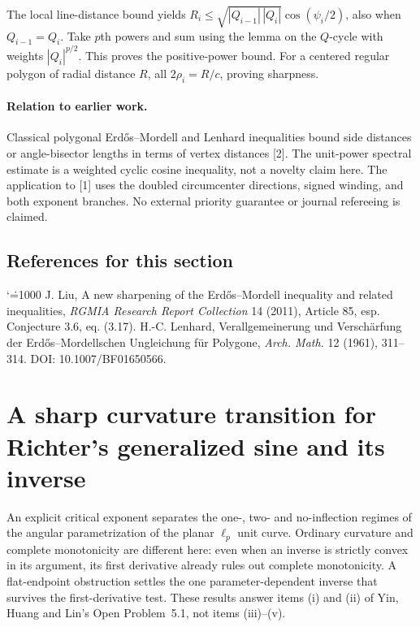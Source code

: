 \documentclass[11pt,a4paper]{article}
\makeatletter
\numberwithin{equation}{section}
\theoremstyle{definition}
\theoremstyle{remark}
\newenvironment{sectionabstract}{\par\smallskip\begingroup\small\noindent}{\par\endgroup\medskip}
\renewenvironment{thebibliography}[1]
 {\subsection*{References for this section}\small
  \list{\@biblabel{\@arabic\c@enumiv}}
       {\settowidth\labelwidth{\@biblabel{#1}}\leftmargin\labelwidth
        \advance\leftmargin\labelsep\@openbib@code
        \usecounter{enumiv}\let\p@enumiv\@empty
        \renewcommand\theenumiv{\@arabic\c@enumiv}}
  \sloppy\clubpenalty4000\widowpenalty4000\sfcode`\.=1000\relax}
 {\def\@noitemerr{\@latex@warning{Empty bibliography}}\endlist}
\makeatother
\begin{document}
The local line-distance bound yields $R_i\le\sqrt{|Q_{i-1}|\,|Q_i|}\cos(\psi_i/2)$, also when $Q_{i-1}=Q_i$. Take $p$th powers and sum using the lemma on the $Q$-cycle with weights $|Q_i|^{p/2}$. This proves the positive-power bound. For a centered regular polygon of radial distance $R$, all $2\rho_i=R/c$, proving sharpness.
\paragraph{Relation to earlier work.} Classical polygonal Erd\H{o}s--Mordell and Lenhard inequalities bound side distances or angle-bisector lengths in terms of vertex distances [2]. The unit-power spectral estimate is a weighted cyclic cosine inequality, not a novelty claim here. The application to [1] uses the doubled circumcenter directions, signed winding, and both exponent branches. No external priority guarantee or journal refereeing is claimed.
\begin{thebibliography}{9}
 J. Liu, A new sharpening of the Erd\H{o}s--Mordell inequality and related inequalities, \emph{RGMIA Research Report Collection} 14 (2011), Article 85, esp. Conjecture 3.6, eq. (3.17).
 H.-C. Lenhard, Verallgemeinerung und Versch\"arfung der Erd\H{o}s--Mordellschen Ungleichung f\"ur Polygone, \emph{Arch. Math.} 12 (1961), 311--314. DOI: 10.1007/BF01650566.
\end{thebibliography}

\par\endgroup

\begingroup
\newcommand{\sgn}{\operatorname{sgn}}
\section{\texorpdfstring{A sharp curvature transition for Richter's generalized sine and its inverse}{A sharp curvature transition for Richter's generalized sine and its inverse}}\label{section:r42heisei}
\par\medskip


\begin{sectionabstract}
An explicit critical exponent separates the one-, two- and no-inflection regimes of the angular parametrization of the planar $\ell_p$ unit curve. Ordinary curvature and complete monotonicity are different here: even when an inverse is strictly convex in its argument, its first derivative already rules out complete monotonicity. A flat-endpoint obstruction settles the one parameter-dependent inverse that survives the first-derivative test. These results answer items (i) and (ii) of Yin, Huang and Lin's Open Problem~5.1, not items (iii)--(v).
\end{sectionabstract}
\end{document}
